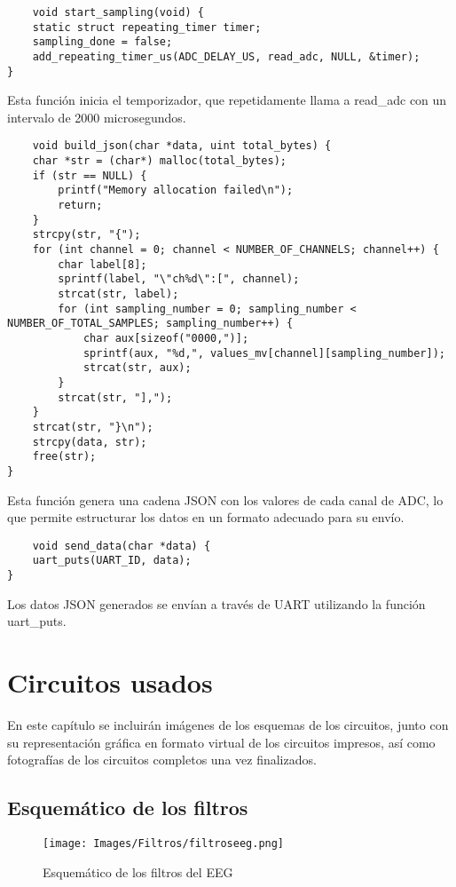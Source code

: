 \documentclass{article}
\begin{document}
\begin{lstlisting}
    void start_sampling(void) {
    static struct repeating_timer timer;
    sampling_done = false;
    add_repeating_timer_us(ADC_DELAY_US, read_adc, NULL, &timer);
}
\end{lstlisting}
Esta función inicia el temporizador, que repetidamente llama a read\_adc con un intervalo de 2000 microsegundos.

\begin{lstlisting}
    void build_json(char *data, uint total_bytes) {
    char *str = (char*) malloc(total_bytes);
    if (str == NULL) {
        printf("Memory allocation failed\n");
        return;
    }
    strcpy(str, "{");
    for (int channel = 0; channel < NUMBER_OF_CHANNELS; channel++) {
        char label[8];
        sprintf(label, "\"ch%d\":[", channel);
        strcat(str, label);
        for (int sampling_number = 0; sampling_number < NUMBER_OF_TOTAL_SAMPLES; sampling_number++) {
            char aux[sizeof("0000,")];
            sprintf(aux, "%d,", values_mv[channel][sampling_number]);
            strcat(str, aux);
        }
        strcat(str, "],");
    }
    strcat(str, "}\n");
    strcpy(data, str);
    free(str);
}
\end{lstlisting}
Esta función genera una cadena JSON con los valores de cada canal de ADC, lo que permite estructurar los datos en un formato adecuado para su envío.

\begin{lstlisting}
    void send_data(char *data) {
    uart_puts(UART_ID, data);
}
\end{lstlisting}
Los datos JSON generados se envían a través de UART utilizando la función uart\_puts.

\section{Circuitos usados}
En este capítulo se incluirán imágenes de los esquemas de los circuitos, junto con su representación gráfica en formato virtual de los circuitos impresos, así como fotografías de los circuitos completos una vez finalizados.


\subsection{Esquemático de los filtros}
\begin{figure}[H]
    \centering
    \texttt{[image: Images/Filtros/filtroseeg.png]}
    \caption{Esquemático de los filtros del EEG}
\end{figure}
\end{document}
